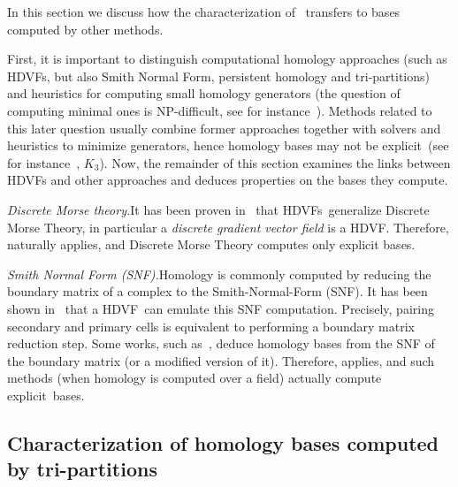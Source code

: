 \documentclass[runningheads]{llncs}
\let\Oldsubsection\subsection
\renewcommand{\subsection}{\FloatBarrier\Oldsubsection}
\newcommand{\explicit}{explicit}
\newcommand{\HC}{HDVF}
\newcommand{\HCs}{HDVFs}
\newcommand{\commentYS}[1]{{\textit{\color{blue}\textbf{YS}: #1}}}
\newcommand{\commentAlex}[1]{{\textit{\color{magenta}#1}}}
\begin{document}
    In this section we discuss how the characterization of~ transfers to bases computed by other methods.

    First, it is important to distinguish computational homology approaches (such as \HCs, but also Smith Normal Form, persistent homology and tri-partitions) and heuristics for computing small homology generators (the question of computing minimal ones is NP-difficult, see for instance~\cite{dey-minimal_cycles_hard_cases}).
    Methods related to this later question usually combine former approaches together with solvers and heuristics to minimize generators, hence homology bases may not be \explicit\ (see for instance~, $K_3$).    
    Now, the remainder of this section examines the links between HDVFs and other approaches and deduces properties on the bases they compute.
    \smallskip
    
    \noindent \textit{Discrete Morse theory.}\quad It has been proven in~\cite{aldo-cycles_discrete_morse_theory} that \HCs\ generalize Discrete Morse Theory, in particular a \textit{discrete gradient vector field} is a \HC. Therefore,  naturally applies, and  Discrete Morse Theory computes only explicit bases.
    \smallskip
    
    \noindent \textit{Smith Normal Form (SNF).}\quad Homology is commonly computed by reducing the boundary matrix of a complex to the Smith-Normal-Form (SNF).
    It has been shown in~\cite{aldo-cycles_discrete_morse_theory} that a \HC\ can emulate this SNF computation.
    Precisely, pairing secondary and primary cells is equivalent to performing a boundary matrix reduction step.
    Some works, such as~\cite{peltier-computation_groups_generators}, deduce homology bases from the SNF of the boundary matrix (or a modified version of it).
    Therefore,  applies, and such methods (when homology is computed over a field) actually compute \explicit\ bases.
    
\subsection{Characterization of homology bases computed by tri-partitions}\label{sect:hc-tri-partition}
\end{document}
